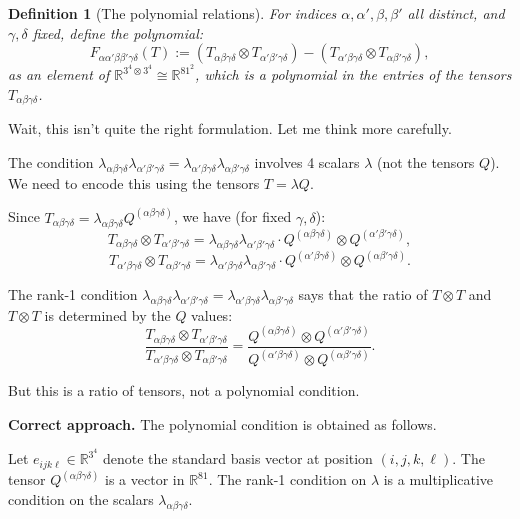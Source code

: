 \documentclass[12pt]{article}
\newtheorem{definition}[theorem]{Definition}
\begin{document}
\begin{definition}[The polynomial relations]
For indices $\alpha, \alpha', \beta, \beta'$ all distinct, and $\gamma, \delta$ fixed, define the polynomial:
\[
F_{\alpha\alpha'\beta\beta'\gamma\delta}(T) := (T_{\alpha\beta\gamma\delta} \otimes T_{\alpha'\beta'\gamma\delta}) - (T_{\alpha'\beta\gamma\delta} \otimes T_{\alpha\beta'\gamma\delta}),
\]
as an element of $\mathbb{R}^{3^4 \otimes 3^4} \cong \mathbb{R}^{81^2}$, which is a polynomial in the entries of the tensors $T_{\alpha\beta\gamma\delta}$.
\end{definition}

Wait, this isn't quite the right formulation. Let me think more carefully.

The condition $\lambda_{\alpha\beta\gamma\delta} \lambda_{\alpha'\beta'\gamma\delta} = \lambda_{\alpha'\beta\gamma\delta}\lambda_{\alpha\beta'\gamma\delta}$ involves 4 scalars $\lambda$ (not the tensors $Q$). We need to encode this using the tensors $T = \lambda Q$.

Since $T_{\alpha\beta\gamma\delta} = \lambda_{\alpha\beta\gamma\delta} Q^{(\alpha\beta\gamma\delta)}$, we have (for fixed $\gamma, \delta$):
\[
T_{\alpha\beta\gamma\delta} \otimes T_{\alpha'\beta'\gamma\delta} = \lambda_{\alpha\beta\gamma\delta}\lambda_{\alpha'\beta'\gamma\delta} \cdot Q^{(\alpha\beta\gamma\delta)} \otimes Q^{(\alpha'\beta'\gamma\delta)},
\]
\[
T_{\alpha'\beta\gamma\delta} \otimes T_{\alpha\beta'\gamma\delta} = \lambda_{\alpha'\beta\gamma\delta}\lambda_{\alpha\beta'\gamma\delta} \cdot Q^{(\alpha'\beta\gamma\delta)} \otimes Q^{(\alpha\beta'\gamma\delta)}.
\]

The rank-1 condition $\lambda_{\alpha\beta\gamma\delta}\lambda_{\alpha'\beta'\gamma\delta} = \lambda_{\alpha'\beta\gamma\delta}\lambda_{\alpha\beta'\gamma\delta}$ says that the ratio of $T \otimes T$ and $T \otimes T$ is determined by the $Q$ values:
\[
\frac{T_{\alpha\beta\gamma\delta} \otimes T_{\alpha'\beta'\gamma\delta}}{T_{\alpha'\beta\gamma\delta} \otimes T_{\alpha\beta'\gamma\delta}} = \frac{Q^{(\alpha\beta\gamma\delta)} \otimes Q^{(\alpha'\beta'\gamma\delta)}}{Q^{(\alpha'\beta\gamma\delta)} \otimes Q^{(\alpha\beta'\gamma\delta)}}.
\]

But this is a ratio of tensors, not a polynomial condition.

\textbf{Correct approach.} The polynomial condition is obtained as follows.

Let $e_{ijk\ell} \in \mathbb{R}^{3^4}$ denote the standard basis vector at position $(i,j,k,\ell)$. The tensor $Q^{(\alpha\beta\gamma\delta)}$ is a vector in $\mathbb{R}^{81}$. The rank-1 condition on $\lambda$ is a multiplicative condition on the scalars $\lambda_{\alpha\beta\gamma\delta}$.
\end{document}
